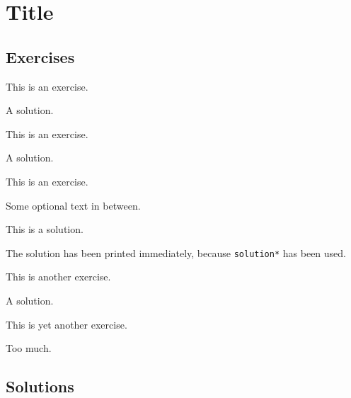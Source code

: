 \documentclass{book}
\theoremstyle{exercise} %
\theoremstyle{definition}
\begin{document}
\chapter{Title}

\section{Exercises}

\begin{exercise}
This is an exercise.
\end{exercise}
\begin{solution}
A solution.
\end{solution}

\begin{exercise}
This is an exercise.
\end{exercise}
\begin{solution}
A solution.
\end{solution}

\begin{exercise}
This is an exercise.
\end{exercise}

Some optional text in between.

\begin{solution*}
This is a solution.
\end{solution*}

The solution has been printed immediately, because
\texttt{solution*} has been used.

\begin{exercise}
This is another exercise.
\end{exercise}
\begin{solution}
A solution.
\end{solution}

\begin{exercise}
This is yet another exercise.
\end{exercise}
\begin{solution}
Too much.
\end{solution}

\clearpage
\section{Solutions}
\printsolutions
\end{document}
